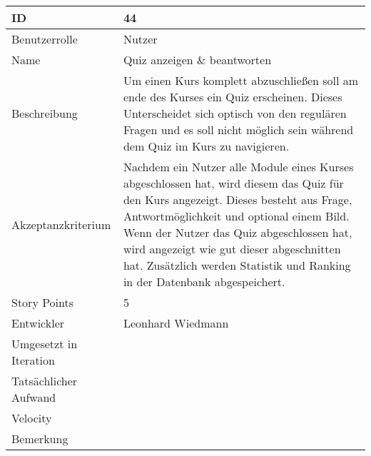 \begin{tabularx}{\textwidth}{|p{}|X|}
	\hline
	ID & 44\\
	\hline
	Benutzerrolle & Nutzer\\
	\hline
	Name & Quiz anzeigen \& beantworten\\
	\hline
	Beschreibung & Um einen Kurs komplett abzuschließen soll am ende des Kurses ein Quiz erscheinen. Dieses Unterscheidet sich optisch von den regulären Fragen und es soll nicht möglich sein während dem Quiz im Kurs zu navigieren.\\
	\hline
	Akzeptanzkriterium & Nachdem ein Nutzer alle Module eines Kurses abgeschlossen hat, wird diesem das Quiz für den Kurs angezeigt. Dieses besteht aus Frage, Antwortmöglichkeit und optional einem Bild. Wenn der Nutzer das Quiz abgeschlossen hat, wird angezeigt wie gut dieser abgeschnitten hat. Zusätzlich werden Statistik und Ranking in der Datenbank abgespeichert. \\
	\hline
	Story Points & 5\\
	\hline
	Entwickler & Leonhard Wiedmann\\
	\hline
	Umgesetzt in Iteration & \\
	\hline
	Tatsächlicher Aufwand & \\
	\hline
	Velocity & \\
	\hline
	Bemerkung & \\
	\hline
\end{tabularx}
\vspace{20pt}
